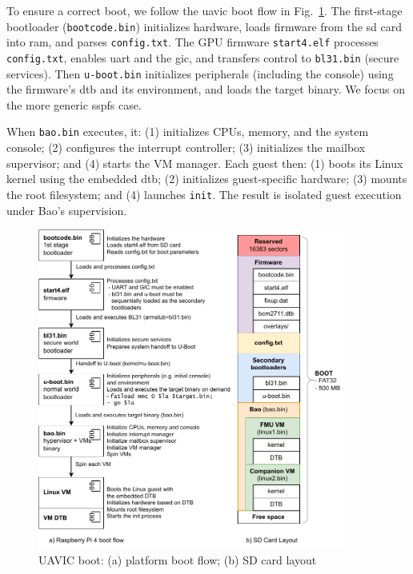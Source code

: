 To ensure a correct boot, we follow the \gls{uavic} boot flow in
Fig.~\ref{fig:uav-main-rpi4-boot}. The first-stage bootloader
(\lstinline{bootcode.bin}) initializes hardware, loads firmware from the
\gls{sd} card into \gls{ram}, and parses \lstinline{config.txt}. The GPU
firmware \lstinline{start4.elf} processes \lstinline{config.txt}, enables
\gls{uart} and the \gls{gic}, and transfers control to \lstinline{bl31.bin}
(secure services). Then \lstinline{u-boot.bin} initializes peripherals (including
the console) using the firmware’s \gls{dtb} and its environment, and loads the
target binary. We focus on the more generic \gls{sspfs} case.

When \lstinline{bao.bin} executes, it:
(1) initializes CPUs, memory, and the system console;
(2) configures the interrupt controller;
(3) initializes the mailbox supervisor; and
(4) starts the VM manager.
Each guest then:
(1) boots its Linux kernel using the embedded \gls{dtb};
(2) initializes guest-specific hardware;
(3) mounts the root filesystem; and
(4) launches \lstinline{init}.
The result is isolated guest execution under Bao's supervision.

\begin{figure}[!hbt]
  \centering
  \includegraphics[width=0.9\textwidth]{./img/pdf/uav-main-rpi4-boot}
  \caption{UAVIC boot: (a) platform boot flow; (b) SD card layout}%
  \label{fig:uav-main-rpi4-boot}
\end{figure}

